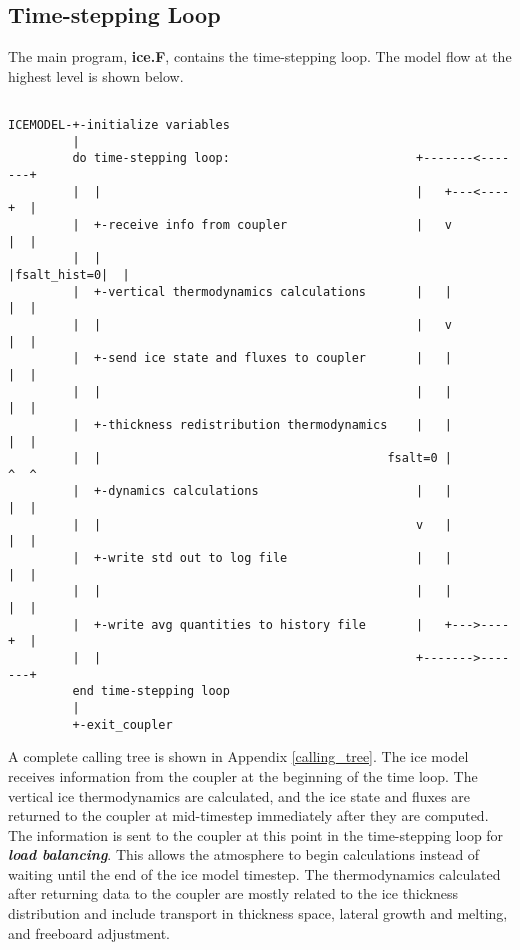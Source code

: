 
\subsection {Time-stepping Loop}
\label{sec:small_tree}

The main program, {\bf ice.F}, contains the time-stepping loop.
The model flow at the highest level is shown below.

\begin{verbatim}

ICEMODEL-+-initialize variables
         |
         do time-stepping loop:                          +-------<-------+
         |  |                                            |   +---<----+  |
         |  +-receive info from coupler                  |   v        |  |
         |  |                                            |fsalt_hist=0|  |
         |  +-vertical thermodynamics calculations       |   |        |  |
         |  |                                            |   v        |  |
         |  +-send ice state and fluxes to coupler       |   |        |  |
         |  |                                            |   |        |  |
         |  +-thickness redistribution thermodynamics    |   |        |  |
         |  |                                        fsalt=0 |        ^  ^
         |  +-dynamics calculations                      |   |        |  |
         |  |                                            v   |        |  |
         |  +-write std out to log file                  |   |        |  |
         |  |                                            |   |        |  |
         |  +-write avg quantities to history file       |   +--->----+  |
         |  |                                            +------->-------+
         end time-stepping loop   
         |
         +-exit_coupler

\end{verbatim}

A complete calling tree is shown in Appendix \ref{calling_tree}.
The ice model receives information from the coupler at the beginning of the time
loop.  The vertical ice thermodynamics are calculated, and the ice state and 
fluxes are returned to the coupler at mid-timestep immediately after they are computed.
The information is sent to the coupler at this point in the time-stepping loop
for {\bf \textsl{load balancing}}.  This allows the atmosphere
to begin calculations instead of waiting until the end of the ice model timestep.
The thermodynamics calculated after returning data to the coupler are mostly
related to the ice thickness distribution and include transport in thickness 
space, lateral growth and melting, and freeboard adjustment.

